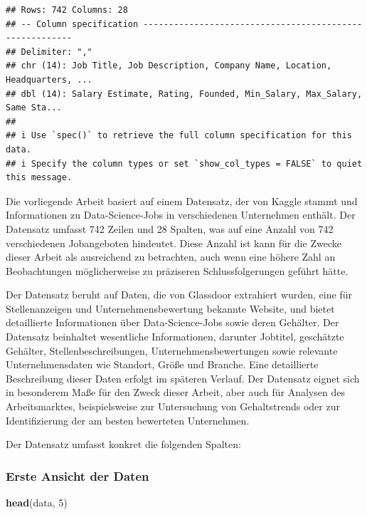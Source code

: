\documentclass[
]{article}
\newenvironment{Shaded}{\begin{snugshade}}{\end{snugshade}}
\newcommand{\DecValTok}[1]{\textcolor[rgb]{0.00,0.00,0.81}{#1}}
\newcommand{\FunctionTok}[1]{\textcolor[rgb]{0.13,0.29,0.53}{\textbf{#1}}}
\newcommand{\NormalTok}[1]{#1}
\begin{document}
\begin{verbatim}
## Rows: 742 Columns: 28
## -- Column specification --------------------------------------------------------
## Delimiter: ","
## chr (14): Job Title, Job Description, Company Name, Location, Headquarters, ...
## dbl (14): Salary Estimate, Rating, Founded, Min_Salary, Max_Salary, Same Sta...
## 
## i Use `spec()` to retrieve the full column specification for this data.
## i Specify the column types or set `show_col_types = FALSE` to quiet this message.
\end{verbatim}

Die vorliegende Arbeit basiert auf einem Datensatz, der von Kaggle
stammt und Informationen zu Data-Science-Jobs in verschiedenen
Unternehmen enthält. Der Datensatz umfasst 742 Zeilen und 28 Spalten,
was auf eine Anzahl von 742 verschiedenen Jobangeboten hindeutet. Diese
Anzahl ist kann für die Zwecke dieser Arbeit als ausreichend zu
betrachten, auch wenn eine höhere Zahl an Beobachtungen möglicherweise
zu präziseren Schlussfolgerungen geführt hätte.

Der Datensatz beruht auf Daten, die von Glassdoor extrahiert wurden,
eine für Stellenanzeigen und Unternehmensbewertung bekannte Website, und
bietet detaillierte Informationen über Data-Science-Jobs sowie deren
Gehälter. Der Datensatz beinhaltet wesentliche Informationen, darunter
Jobtitel, geschätzte Gehälter, Stellenbeschreibungen,
Unternehmensbewertungen sowie relevante Unternehmensdaten wie Standort,
Größe und Branche. Eine detaillierte Beschreibung dieser Daten erfolgt
im späteren Verlauf. Der Datensatz eignet sich in besonderem Maße für
den Zweck dieser Arbeit, aber auch für Analysen des Arbeitsmarktes,
beispielsweise zur Untersuchung von Gehaltstrends oder zur
Identifizierung der am besten bewerteten Unternehmen.

Der Datensatz umfasst konkret die folgenden Spalten:

\subsubsection{Erste Ansicht der Daten}\label{erste-ansicht-der-daten}

\begin{Shaded}
\begin{Highlighting}[]
\FunctionTok{head}\NormalTok{(data, }\DecValTok{5}\NormalTok{)}
\end{Highlighting}
\end{Shaded}
\end{document}

